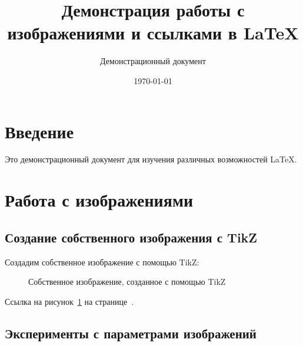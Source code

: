 \documentclass[12pt]{article}
\begin{document}
\title{Демонстрация работы с изображениями и ссылками в LaTeX}
\author{Демонстрационный документ}
\date{\today}
\maketitle

\tableofcontents

\section{Введение}
\label{sec:intro}
Это демонстрационный документ для изучения различных возможностей LaTeX.

\lipsum[1-2]

\section{Работа с изображениями}
\label{sec:images}

\subsection{Создание собственного изображения с TikZ}
\label{subsec:tikz}

Создадим собственное изображение с помощью TikZ:

\begin{figure}[htbp]
    \centering
    \caption{Собственное изображение, созданное с помощью TikZ}
    \label{fig:myhouse}
\end{figure}

Ссылка на рисунок~\ref{fig:myhouse} на странице~\pageref{fig:myhouse}.

\subsection{Эксперименты с параметрами изображений}
\label{subsec:params}
\end{document}
